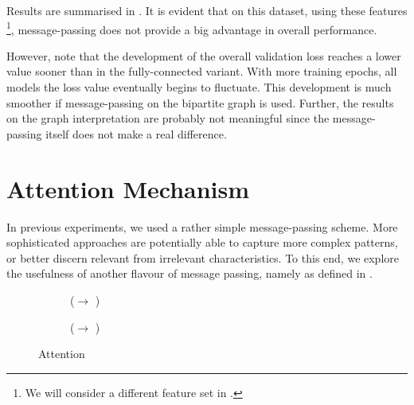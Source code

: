 \documentclass[
	fontsize=10pt, %
	twoside=false, %
	secnumdepth=1, %
  toc=indentunnumbered %
]{kaobook}
\begin{document}
Results are summarised in . It is evident
that on this dataset, using these features
\footnote{
  We will consider a different feature set in .
},
message-passing does not provide a big advantage in overall performance.

However, note that the development of the overall validation loss reaches a
lower value sooner than in the fully-connected variant. With more training
epochs, all models the loss value eventually begins to fluctuate. This
development is much smoother if message-passing on the bipartite graph is used.
Further, the results on the graph interpretation are probably not meaningful
since the message-passing itself does not make a real difference.






\section{Attention Mechanism}

In previous experiments, we used a rather simple message-passing scheme. More
sophisticated approaches are potentially able to capture more complex patterns,
or better discern relevant from irrelevant characteristics. To this end, we
explore the usefulness of another flavour of message passing, namely  as defined in .




\begin{figure}[h]
\centering
\begin{subfigure}[h]{0.48\linewidth}
  \caption{(\ADLast $\rightarrow$ \PDMap)}
\end{subfigure}
\begin{subfigure}[h]{0.48\linewidth}
  \caption{(\ADLast $\rightarrow$ \ReconMap)}
\end{subfigure}
\caption{Attention}
\label{fig:results-attention}
\end{figure}
\end{document}
